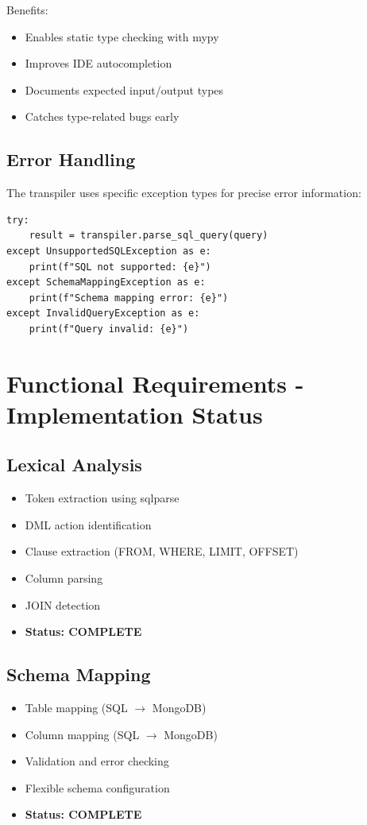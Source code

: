 \documentclass[12pt,a4paper]{article}
\begin{document}
Benefits:
\begin{itemize}
    \item Enables static type checking with mypy
    \item Improves IDE autocompletion
    \item Documents expected input/output types
    \item Catches type-related bugs early
\end{itemize}

\subsection{Error Handling}

The transpiler uses specific exception types for precise error information:

\begin{lstlisting}
try:
    result = transpiler.parse_sql_query(query)
except UnsupportedSQLException as e:
    print(f"SQL not supported: {e}")
except SchemaMappingException as e:
    print(f"Schema mapping error: {e}")
except InvalidQueryException as e:
    print(f"Query invalid: {e}")
\end{lstlisting}

\newpage

\section{Functional Requirements - Implementation Status}

\subsection{Lexical Analysis}
\begin{itemize}
    \item[$\checkmark$] Token extraction using sqlparse
    \item[$\checkmark$] DML action identification
    \item[$\checkmark$] Clause extraction (FROM, WHERE, LIMIT, OFFSET)
    \item[$\checkmark$] Column parsing
    \item[$\checkmark$] JOIN detection
    \item \textbf{Status: COMPLETE}
\end{itemize}

\subsection{Schema Mapping}
\begin{itemize}
    \item[$\checkmark$] Table mapping (SQL $\rightarrow$ MongoDB)
    \item[$\checkmark$] Column mapping (SQL $\rightarrow$ MongoDB)
    \item[$\checkmark$] Validation and error checking
    \item[$\checkmark$] Flexible schema configuration
    \item \textbf{Status: COMPLETE}
\end{itemize}
\end{document}
